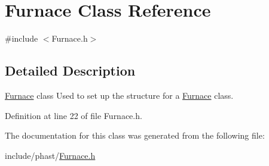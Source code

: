 \hypertarget{class_furnace}{}\section{Furnace Class Reference}
\label{class_furnace}


{\ttfamily \#include $<$Furnace.\+h$>$}



\subsection{Detailed Description}
\hyperlink{class_furnace}{Furnace} class Used to set up the structure for a \hyperlink{class_furnace}{Furnace} class. 

Definition at line 22 of file Furnace.\+h.



The documentation for this class was generated from the following file\+:\begin{DoxyCompactItemize}
\item 
include/phast/\hyperlink{_furnace_8h}{Furnace.\+h}\end{DoxyCompactItemize}
